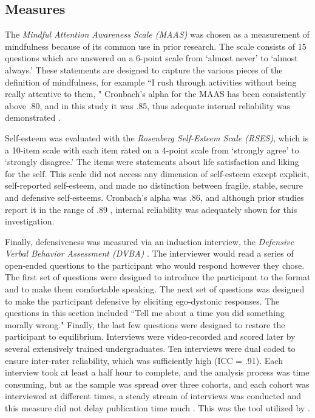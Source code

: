 \documentclass[jou]{apa}
\begin{document}
\subsection{Measures}
The \textit{Mindful Attention Awareness Scale (MAAS)} was chosen as a measurement of mindfulness because of its common use in prior research.  The scale consists of 15 questions which are answered on a 6-point scale from `almost never' to `almost always.'  These statements are designed to capture the various pieces of the definition of mindfulness, for example ``I rush through activities without being really attentive to them, \cite{brown2003}"   Cronbach's alpha for the MAAS has been consistently above .80, and in this study it was .85, thus adequate internal reliability was demonstrated \cite{lakey2008, brown2003}.  

Self-esteem was evaluated with the \textit{Rosenberg Self-Esteem Scale (RSES)}, which is a 10-item scale with each item rated on a 4-point scale from `strongly agree' to `strongly disagree.'  The items were statements about life satisfaction and liking for the self.  This scale did not access any dimension of self-esteem except explicit, self-reported self-esteem, and made no distinction between fragile, stable, secure and defensive self-esteems.  Cronbach's alpha was .86, and although prior studies report it in the range of .89 \cite{lakey2008}, internal reliability was adequately shown for this investigation.  

Finally, defensiveness was measured via an induction interview, the \textit{Defensive Verbal Behavior Assessment (DVBA)} \cite{barrett2002}.  The interviewer would read a series of open-ended questions to the participant who would respond however they chose.  The first set of questions were designed to introduce the participant to the format and to make them comfortable speaking.  The next set of questions was designed to make the participant defensive by eliciting ego-dystonic responses.  The questions in this section included ``Tell me about a time you did something morally wrong."  Finally, the last few questions were designed to restore the participant to equilibrium.  Interviews were video-recorded and scored later by several extensively trained undergraduates.  Ten interviews were dual coded to ensure inter-rater reliability, which was sufficiently high (ICC = .91).  Each interview took at least a half hour to complete, and the analysis process was time consuming, but as the sample was spread over three cohorts, and each cohort was interviewed at different times, a steady stream of interviews was conducted and this measure did not delay publication time much \cite{barrett2002}.  This was the tool utilized by \cite{rasmussen2011}.
\end{document}
